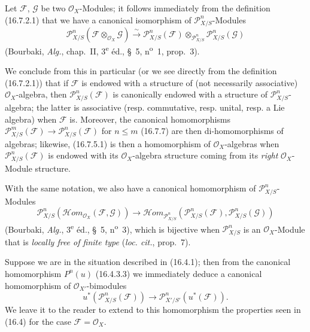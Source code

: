 
\begin{env}[16.7.8]
\label{IV.16.7.8}
Let $\mathscr{F}$, $\mathscr{G}$ be two $\mathcal{O}_X$-Modules; it follows
immediately from the definition (16.7.2.1) that we have a canonical
isomorphism of $\mathscr{P}_{X/S}^n$-Modules
\[
  \mathscr{P}_{X/S}^n(\mathscr{F}\otimes_{\mathcal{O}_X}\mathscr{G})
  \xrightarrow{\sim}
  \mathscr{P}_{X/S}^n(\mathscr{F})
  \otimes_{\mathscr{P}_{X/S}^n}\mathscr{P}_{X/S}^n(\mathscr{G})
  \tag{16.7.8.1}
  \label{IV.16.7.8.1}
\]
(Bourbaki, \emph{Alg.}, chap.~II, 3\textsuperscript{e} éd., §~5,
n\textsuperscript{o}~1, prop.~3).

We conclude from this in particular (or we see directly from the definition
(16.7.2.1)) that if $\mathscr{F}$ is endowed with a structure of
(not necessarily associative) $\mathcal{O}_X$-algebra, then
$\mathscr{P}_{X/S}^n(\mathscr{F})$ is canonically endowed with a structure of
$\mathscr{P}_{X/S}^n$-algebra; the latter is associative (resp.
commutative, resp. unital, resp. a Lie algebra) when $\mathscr{F}$ is.
Moreover, the canonical homomorphisms
$\mathscr{P}_{X/S}^m(\mathscr{F})\to\mathscr{P}_{X/S}^n(\mathscr{F})$ for
$n\leq m$ (16.7.7) are then di-homomorphisms of algebras; likewise,
(16.7.5.1) is then a homomorphism of $\mathcal{O}_X$-algebras when
$\mathscr{P}_{X/S}^n(\mathscr{F})$ is endowed with its
$\mathcal{O}_X$-algebra structure coming from its \emph{right}
$\mathcal{O}_X$-Module structure.

With the same notation, we also have a canonical homomorphism of
$\mathscr{P}_{X/S}^n$-Modules
\[
  \mathscr{P}_{X/S}^n
  (\mathscr{H}\!om_{\mathcal{O}_X}(\mathscr{F},\mathscr{G}))
  \longrightarrow
  \mathscr{H}\!om_{\mathscr{P}_{X/S}^n}
  (\mathscr{P}_{X/S}^n(\mathscr{F}),\mathscr{P}_{X/S}^n(\mathscr{G}))
  \tag{16.7.8.2}
  \label{IV.16.7.8.2}
\]
(Bourbaki, \emph{Alg.}, 3\textsuperscript{e} éd., §~5,
n\textsuperscript{o}~3), which is bijective when $\mathscr{P}_{X/S}^n$ is
an $\mathcal{O}_X$-Module that is \emph{locally free of finite type}
(\emph{loc. cit.}, prop.~7).
\end{env}

\begin{env}[16.7.9]
\label{IV.16.7.9}
Suppose we are in the situation described in (16.4.1); then from the
canonical homomorphism $P^n(u)$ (16.4.3.3) we immediately deduce a
canonical homomorphism of $\mathcal{O}_{X'}$-bimodules
\[
  u^*(\mathscr{P}_{X/S}^n(\mathscr{F}))
  \longrightarrow
  \mathscr{P}_{X'/S'}^n(u^*(\mathscr{F})).
  \tag{16.7.9.1}
  \label{IV.16.7.9.1}
\]
We leave it to the reader to extend to this homomorphism the properties
seen in (16.4) for the case $\mathscr{F}=\mathcal{O}_X$.
\end{env}

